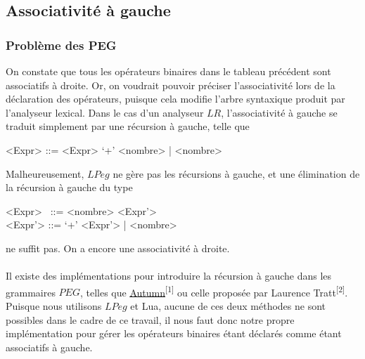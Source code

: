 \documentclass{article}
\begin{document}
\subsection{Associativité à gauche}
\subsubsection{Problème des PEG}
On constate que tous les opérateurs binaires dans le tableau précédent sont associatifs à droite. Or, on voudrait pouvoir préciser l'associativité lors de la déclaration des opérateurs, puisque cela modifie l'arbre syntaxique produit par l'analyseur lexical. Dans le cas d'un analyseur $LR$, l'associativité à gauche se traduit simplement par une récursion à gauche, telle que
\begin{grammar}
	<Expr> ::= <Expr> `+' <nombre> | <nombre>
\end{grammar}
Malheureusement, $LPeg$ ne gère pas les récursions à gauche, et une élimination de la récursion à gauche du type
\begin{grammar}
<Expr> \ ::= <nombre> <Expr'> \\
<Expr'> ::= `+' <Expr'> | <nombre>
\end{grammar}
ne suffit pas. On a encore une associativité à droite. \\ \\
Il existe des implémentations pour introduire la récursion à gauche dans les grammaires $PEG$, telles que \underline{\href{https://github.com/norswap/whimsy/blob/master/doc/autumn/README.md}{Autumn}}\textsuperscript{[1]} ou celle proposée par Laurence Tratt\textsuperscript{[2]}. Puisque nous utilisons $LPeg$ et Lua, aucune de ces deux méthodes ne sont possibles dans le cadre de ce travail, il nous faut donc notre propre implémentation pour gérer les opérateurs binaires étant déclarés comme étant associatifs à gauche.
\end{document}
